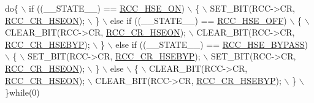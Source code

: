 \begin{DoxyCode}
\textcolor{keywordflow}{do}\{                                                     \(\backslash\)
                      if ((\_\_STATE\_\_) == \hyperlink{group___r_c_c___h_s_e___config_gabc4f70a44776c557af20496b04d9a9db}{RCC\_HSE\_ON})                        \(\backslash\)
                      \{                                                     \(\backslash\)
                        SET\_BIT(RCC->CR, \hyperlink{group___peripheral___registers___bits___definition_gadb8228c9020595b4cf9995137b8c9a7d}{RCC\_CR\_HSEON});                     \(\backslash\)
                      \}                                                     \(\backslash\)
                      else \textcolor{keywordflow}{if} ((\_\_STATE\_\_) == \hyperlink{group___r_c_c___h_s_e___config_ga1616626d23fbce440398578855df6f97}{RCC\_HSE\_OFF})                  \(\backslash\)
                      \{                                                     \(\backslash\)
                        CLEAR\_BIT(RCC->CR, \hyperlink{group___peripheral___registers___bits___definition_gadb8228c9020595b4cf9995137b8c9a7d}{RCC\_CR\_HSEON});                   \(\backslash\)
                        CLEAR\_BIT(RCC->CR, \hyperlink{group___peripheral___registers___bits___definition_gaa3288090671af5a959aae4d7f7696d55}{RCC\_CR\_HSEBYP});                  \(\backslash\)
                      \}                                                     \(\backslash\)
                      else \textcolor{keywordflow}{if} ((\_\_STATE\_\_) == \hyperlink{group___r_c_c___h_s_e___config_ga5ca515db2d5c4d5bdb9ee3d154df2704}{RCC\_HSE\_BYPASS})               \(\backslash\)
                      \{                                                     \(\backslash\)
                        SET\_BIT(RCC->CR, \hyperlink{group___peripheral___registers___bits___definition_gaa3288090671af5a959aae4d7f7696d55}{RCC\_CR\_HSEBYP});                    \(\backslash\)
                        SET\_BIT(RCC->CR, \hyperlink{group___peripheral___registers___bits___definition_gadb8228c9020595b4cf9995137b8c9a7d}{RCC\_CR\_HSEON});                     \(\backslash\)
                      \}                                                     \(\backslash\)
                      else                                                  \(\backslash\)
                      \{                                                     \(\backslash\)
                        CLEAR\_BIT(RCC->CR, \hyperlink{group___peripheral___registers___bits___definition_gadb8228c9020595b4cf9995137b8c9a7d}{RCC\_CR\_HSEON});                   \(\backslash\)
                        CLEAR\_BIT(RCC->CR, \hyperlink{group___peripheral___registers___bits___definition_gaa3288090671af5a959aae4d7f7696d55}{RCC\_CR\_HSEBYP});                  \(\backslash\)
                      \}                                                     \(\backslash\)
                    \}\textcolor{keywordflow}{while}(0)
\end{DoxyCode}


